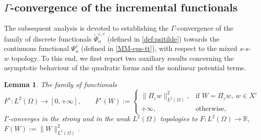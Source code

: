 \documentclass[a4paper,11pt]{article}
\newtheorem{lemma}[theorem]{Lemma}
\theoremstyle{definition}
\numberwithin{equation}{section}
\newcommand{\e}{\varepsilon}
\newcommand{\R}{\mathbb{R}}
\begin{document}

\subsection{$\Gamma$-convergence of the incremental functionals}
The subsequent analysis is devoted to establishing the $\Gamma$-convergence of the family of discrete functionals $\widetilde\Psi_n^{\e,\tau}$ (defined in \eqref{def:psitilde}) towards the continuous functional $\Psi_n^\tau$ (defined in \eqref{MM-eps-tt}), with respect to the mixed $s$-$s$-$w$ topology. To this end, we first report two auxiliary results concerning the asymptotic behaviour of the quadratic forms and the nonlinear potential terms. %

\begin{lemma}
	\label{lemma:Gamma_norm}
	The family of functionals
	\[
	F^\e: L^2(\Omega) \to [0,+\infty],\qquad F^\e(W):=	\begin{cases}
		\|\Pi_\e w\|^2_{L^2(\Omega)}, & \text{if } W = \Pi_\e w,\ w \in X^\e \\
		+\infty, & \text{otherwise},
	\end{cases}
	\]
	$\Gamma$-converges in the strong and in the weak $L^2(\Omega)$ topologies to $F: L^2(\Omega) \to \R$, $F(W):=\|W\|^2_{L^2(\Omega)}$.
\end{lemma}
\end{document}
